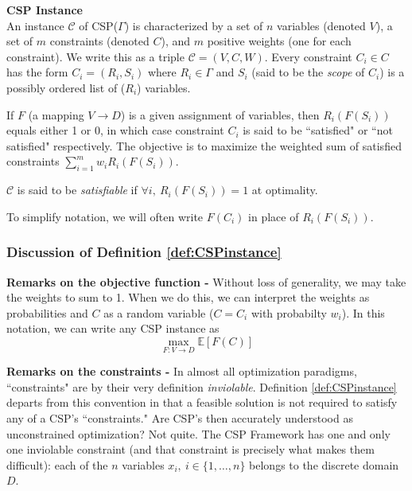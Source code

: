 \begin{definition}
\textbf{CSP Instance}\\
An instance $\mathcal{C}$ of CSP($\Gamma$) is characterized by a set of $n$ variables (denoted $V$), a set of $m$ constraints (denoted $C$), and $m$ positive weights (one for each constraint). We write this as a triple $\mathcal{C} = (V,C,W)$.
Every constraint $C_i \in C$ has the form $C_i = (R_i,S_i)$ where $R_i \in \Gamma$ and $S_i$ (said to be the \textit{scope} of $C_i$) is a possibly ordered list of ($R_i$) variables. 

If $F$ (a mapping $ V\to D$) is a given assignment of variables, then $R_i(F(S_i))$ equals either 1 or 0, in which case constraint $C_i$ is said to be ``satisfied" or ``not satisfied" respectively.
The objective is to maximize the weighted sum of satisfied constraints $\sum_{i = 1}^m w_i R_i(F(S_i))$. 

$\mathcal{C}$ is said to be \textit{satisfiable} if $\forall i, ~ R_i(F(S_i)) = 1$ at optimality.
\label{def:CSPinstance}
\end{definition}
To simplify notation, we will often write $F(C_i)$ in place of $R_i(F(S_i))$.

\subsubsection{Discussion of Definition \ref{def:CSPinstance}}
\textbf{Remarks on the objective function - }Without loss of generality, we may take the weights to sum to 1. 
When we do this, we can interpret the weights as probabilities and $C$ as a random variable ($C = C_i$ with probabilty $w_i$). 
In this notation, we can write any CSP instance as
\begin{equation}
\max_{F: V \to D} \mathbb{E}\left[F(C)\right]
\end{equation}

\textbf{Remarks on the constraints - }In almost all optimization paradigms, ``constraints" are by their very definition \textit{inviolable}. 
Definition \ref{def:CSPinstance} departs from this convention in that a feasible solution is not required to satisfy any of a CSP's ``constraints." 
Are CSP's then accurately understood as unconstrained optimization? 
Not quite. 
The CSP Framework has one and only one inviolable constraint (and that constraint is precisely what makes them difficult): each of the $n$ variables $x_i, ~ i \in\{1,\ldots,n\}$ belongs to the discrete domain $D$. 

